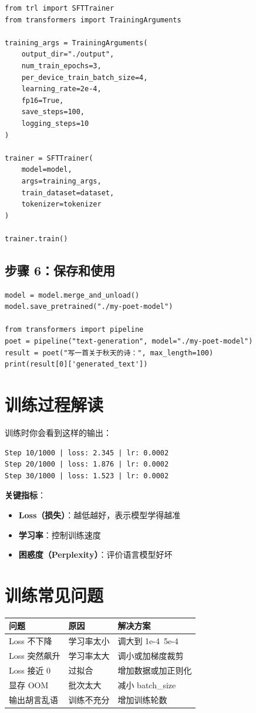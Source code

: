 \documentclass[12pt,UTF8]{ctexbook}
\begin{document}
\begin{verbatim}
from trl import SFTTrainer
from transformers import TrainingArguments

training_args = TrainingArguments(
    output_dir="./output",
    num_train_epochs=3,
    per_device_train_batch_size=4,
    learning_rate=2e-4,
    fp16=True,
    save_steps=100,
    logging_steps=10
)

trainer = SFTTrainer(
    model=model,
    args=training_args,
    train_dataset=dataset,
    tokenizer=tokenizer
)

trainer.train()
\end{verbatim}

\subsection{步骤 6：保存和使用}

\begin{verbatim}
model = model.merge_and_unload()
model.save_pretrained("./my-poet-model")

from transformers import pipeline
poet = pipeline("text-generation", model="./my-poet-model")
result = poet("写一首关于秋天的诗：", max_length=100)
print(result[0]['generated_text'])
\end{verbatim}

\section{训练过程解读}

训练时你会看到这样的输出：

\begin{verbatim}
Step 10/1000 | loss: 2.345 | lr: 0.0002
Step 20/1000 | loss: 1.876 | lr: 0.0002
Step 30/1000 | loss: 1.523 | lr: 0.0002
\end{verbatim}

\textbf{关键指标}：
\begin{itemize}
  \item \textbf{Loss（损失）}：越低越好，表示模型学得越准
  \item \textbf{学习率}：控制训练速度
  \item \textbf{困惑度（Perplexity）}：评价语言模型好坏
\end{itemize}

\section{训练常见问题}

\begin{tabular}{|l|l|l|}
\hline
\textbf{问题} & \textbf{原因} & \textbf{解决方案} \\
\hline
Loss 不下降 & 学习率太小 & 调大到 1e-4~5e-4 \\
Loss 突然飙升 & 学习率太大 & 调小或加梯度裁剪 \\
Loss 接近 0 & 过拟合 & 增加数据或加正则化 \\
显存 OOM & 批次太大 & 减小 batch\_size \\
输出胡言乱语 & 训练不充分 & 增加训练轮数 \\
\hline
\end{tabular}
\end{document}
